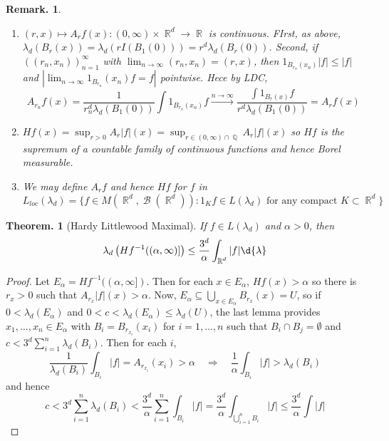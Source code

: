 \documentclass[11pt, a4paper]{memoir}
\DeclareMathOperator{\Q}{{\mathbb{Q}}}
\DeclareMathOperator{\R}{{\mathbb{R}}}
\theoremstyle{change}
\newtheorem{theorem}{Theorem.}[section]
\theoremstyle{plain}
\theoremstyle{nonumberplain}
\newtheorem{remark}{Remark.}
\newtheorem{proof}{Proof}
\DeclareMathOperator{\B}{{\mathcal{B}}}
\begin{document}
\begin{remark}
    \begin{enumerate}[nl,r]
        \item $(r,x)\mapsto A_rf(x):(0,\infty)\times\R^d\to\R$ is continuous.
            FIrst, as above, $\lambda_d(B_r(x))=\lambda_d(rI(B_1(0)))=r^d\lambda_d(B_r(0))$.
            Second, if $((r_n,x_n))_{n=1}^\infty$ with $\lim_{n\to\infty}(r_n,x_n)=(r,x)$, then $1_{B_{r_n}(x_n)}|f|\leq|f|$ and $|\lim_{n\to\infty}1_{B_{r_n}}(x_n)f=f|$ pointwise.
            Hece by LDC,
            \begin{equation*}
                A_{r_n}f(x)=\frac{1}{r_n^d\lambda_d(B_1(0))}\int 1_{B_{r_n}(x_n)}f\overset{n\to\infty}{\longrightarrow}\frac{\int 1_{B_r(x)}f}{r^d\lambda_d(B_1(0))}=A_rf(x)
            \end{equation*}
        \item $Hf(x)=\sup_{r>0}A_r|f|(x)=\sup_{r\in(0,\infty)\cap\Q} A_r|f|(x)$ so $Hf$ is the supremum of a countable family of continuous functions and hence Borel measurable.
        \item We may define $A_rf$ and hence $Hf$ for $f$ in
            \begin{equation*}
                L_{loc}(\lambda_d)=\{f\in M(\R^d,\B(\R^d)):1_Kf\in L(\lambda_d)\text{ for any compact }K\subset\R^d\}
            \end{equation*}
    \end{enumerate}
\end{remark}
\begin{theorem}[Hardy Littlewood Maximal]
    If $f\in L(\lambda_d)$ and $\alpha>0$, then
    \begin{equation*}
        \lambda_d\left(Hf^{-1}((\alpha,\infty)]\right)\leq\frac{3^d}{\alpha}\int_{\R^d}|f|\d{\lambda}
    \end{equation*}
\end{theorem}
\begin{proof}
    Let $E_\alpha = Hf^{-1}((\alpha,\infty])$.
    Then for each $x\in E_\alpha$, $Hf(x)>\alpha$ so there is $r_x>0$ such that $A_{r_x}|f|(x)>\alpha$.
    Now, $E_\alpha\subseteq\bigcup_{x\in E_\alpha}B_{r_x}(x)=U$, so if $0<\lambda_d(E_\alpha)$ and $0<c<\lambda_d(E_\alpha)\leq\lambda_d(U)$, the last lemma provides $x_1,\ldots,x_n\in E_\alpha$ with $B_i=B_{r_{x_i}}(x_i)$ for $i=1,\ldots,n$ such that $B_i\cap B_j=\emptyset$ and $c<3^d\sum_{i=1}^n\lambda_d(B_i)$.
    Then for each $i$,
    \begin{equation*}
        \frac{1}{\lambda_d(B_i)}\int_{B_i}|f|=A_{r_{x_i}}(x_i)>\alpha\quad\Rightarrow\quad\frac{1}{\alpha}\int_{B_i}|f|>\lambda_d(B_i)
    \end{equation*}
    and hence
    \begin{equation*}
        c<3^d\sum_{i=1}^n \lambda_d(B_i)<\frac{3^d}{\alpha}\sum_{i=1}^n\int_{B_i}|f|=\frac{3^d}{\alpha}\int_{\bigcup_{i=1}^n B_i}|f|\leq\frac{3^d}{\alpha}\int|f|
    \end{equation*}
\end{proof}
\end{document}
